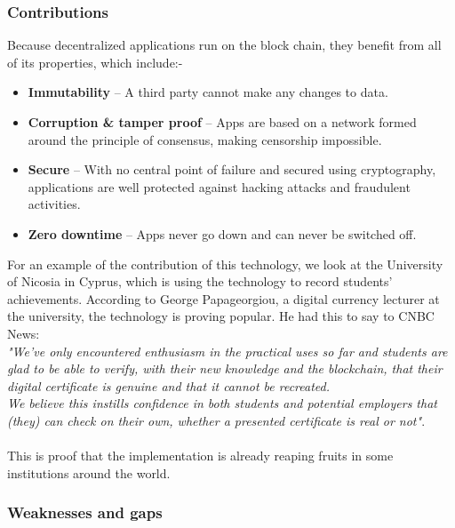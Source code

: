 \subsubsection{Contributions}
Because decentralized applications run on the block chain, they benefit from all of its properties, which include:-\\
\begin{itemize}
\item \textbf{Immutability} – A third party cannot make any changes to data.
\item \textbf{Corruption \& tamper proof} – Apps are based on a network formed around the principle of consensus, making censorship impossible.
\item \textbf{Secure} – With no central point of failure and secured using cryptography, applications are well protected against hacking attacks and fraudulent activities.
\item \textbf{Zero downtime} – Apps never go down and can never be switched off.
\end{itemize}
For an example of the contribution of this technology, we look at the University of Nicosia in Cyprus, which is using the technology to record students' achievements. According to George Papageorgiou, a digital currency lecturer at the university, the technology is proving popular. He had this to say to CNBC News: \\ 
\textit{"We've only encountered enthusiasm in the practical uses so far and students are glad to be able to verify, with their new knowledge and the blockchain, that their digital certificate is genuine and that it cannot be recreated.\\
We believe this instills confidence in both students and potential employers that (they) can check on their own, whether a presented certificate is real or not"}.\cite{art10} \\ \\
This is proof that the implementation is already reaping fruits in some institutions around the world.

\subsubsection{Weaknesses and gaps}

